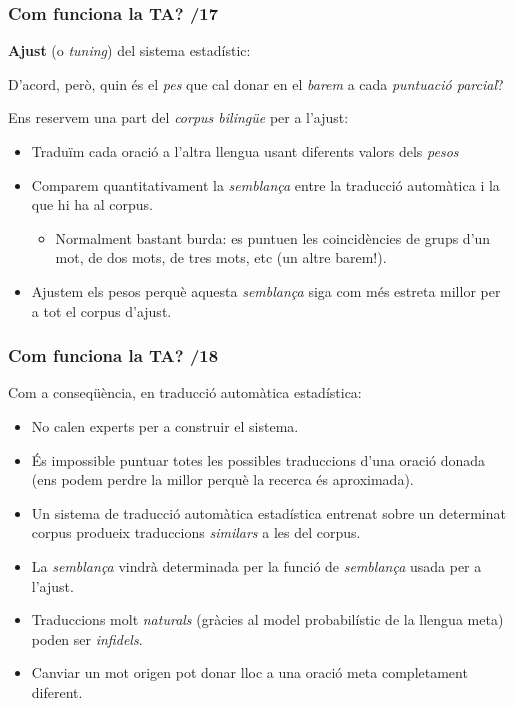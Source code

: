 \documentclass{beamer}
\newcommand{\empha}[1]{\emph{#1}\/}
\begin{document}
\begin{frame}
\frametitle{Com funciona la TA? /17}


\textbf{Ajust} (o \empha{tuning}) del sistema estadístic: 

D'acord, però, quin és el \empha{pes} que cal donar en el \emph{barem} a cada
\empha{puntuació parcial}?

Ens reservem una part del \empha{corpus bilingüe} per a l'ajust:
\begin{itemize}
\item Traduïm cada oració a l'altra llengua usant diferents valors dels \empha{pesos}
\item Comparem quantitativament la \empha{semblança} entre la traducció
  automàtica i la que hi ha al corpus.
  \begin{itemize}
  \item Normalment bastant burda: es puntuen les coincidències de grups d'un mot, de dos mots, de tres mots, etc (un altre barem!).
  \end{itemize}
\item Ajustem els pesos perquè aquesta \empha{semblança} siga com més
  estreta millor per a tot el corpus d'ajust.
\end{itemize}
\end{frame}

\begin{frame}
  \frametitle{Com funciona la TA? /18}
Com a conseqüència, en traducció automàtica estadística:
\begin{itemize}
\item No calen experts per a construir el sistema.
\item És impossible puntuar totes les possibles traduccions d'una
  oració donada (ens podem perdre la millor perquè la recerca és aproximada).
\item Un sistema de traducció automàtica estadística entrenat sobre un determinat corpus produeix traduccions \empha{similars} a les del corpus.
\item La \empha{semblança} vindrà determinada per la funció de \empha{semblança} usada per a l'ajust.
\item Traduccions molt \empha{naturals} (gràcies al model
  probabilístic de la llengua meta) poden ser \empha{infidels}.
\item Canviar un mot origen pot donar lloc a una oració meta completament diferent.
\end{itemize}
\end{frame}
\end{document}
